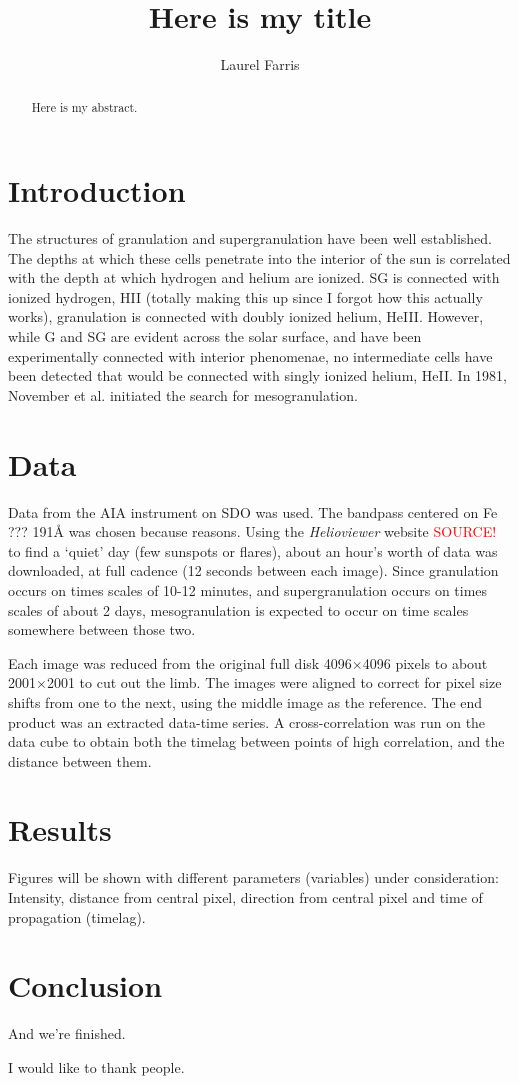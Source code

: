 \documentclass[preprint2]{aastex}
\begin{document}
\title{Here is my title}
\author{Laurel Farris}

\begin{abstract}
Here is my abstract.
\end{abstract}

\section{Introduction}
The structures of granulation and supergranulation have been well
established. The depths at which these cells penetrate into the
interior of the sun is correlated with the depth at which
hydrogen and helium are ionized. SG is connected with ionized
hydrogen, HII
(totally making this up since I forgot how this actually works),
granulation is connected with doubly ionized helium, HeIII.
However, while G and SG are evident across the solar surface, and
have been experimentally connected with interior phenomenae,
no intermediate cells
have been detected that would be connected with singly ionized helium,
HeII.
In 1981, November et al. initiated the search for mesogranulation.


\section{Data}
Data from the AIA instrument on SDO was used.
The bandpass centered on Fe ??? 191\AA{} was chosen because reasons.
Using the \emph{Helioviewer} 
website \textcolor{red}{SOURCE!} to find a `quiet' day (few sunspots or flares),
about an hour's worth of data was downloaded, at full cadence (12
seconds between each image). Since granulation occurs on times scales
of 10-12 minutes, and supergranulation occurs on times scales of about
2 days, mesogranulation is expected to occur on time scales somewhere
between those two. 

Each image was reduced from the original full disk 
4096$\times$4096 pixels to
about 2001$\times$2001 to cut out the limb.
The images were aligned to correct for pixel size shifts from one to
the next, using the middle image as the reference.
The end product was an extracted data-time series.
A cross-correlation was run on the data cube to obtain both the
timelag between points of high correlation, and the distance between
them.

\section{Results}
Figures will be shown with different parameters (variables) under
consideration: Intensity, distance from central pixel,
direction from central pixel and time of propagation (timelag).

\section{Conclusion}
And we're finished.

\acknowledgments I would like to thank people.
\end{document}
